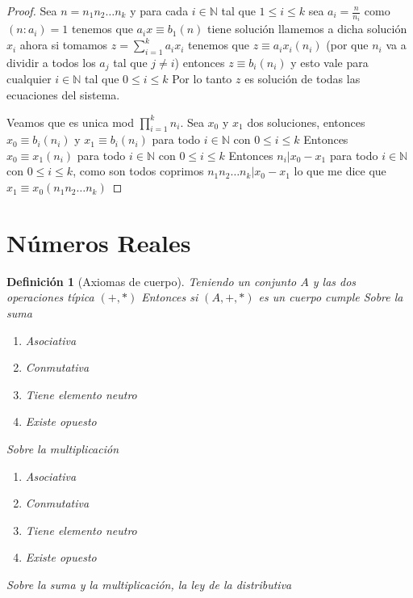 \documentclass{article}
\theoremstyle{break}
\newtheorem{definition}{Definición}[section]
\def \N{\mathbb{N}}
\begin{document}
        \begin{proof}
                Sea $n = n_1n_2\ldots n_k$ y para cada $i\in\N$ tal que $1\leq i \leq k$ sea 
                $a_i = \frac{n}{n_i}$ como $(n:a_i) = 1$ tenemos que $a_ix \equiv b_1 (n)$ tiene solución
                llamemos a dicha solución $x_i$ ahora si tomamos $z = \sum_{i=1}^{k} a_ix_i$ tenemos que 
                $z \equiv a_ix_i (n_i)$ (por que $n_i$ va a dividir a todos los $a_j$ tal que $j\neq i $)
                entonces $z \equiv b_i (n_i)$ y esto vale para cualquier $i\in\N$ tal que $0\leq i \leq k$
                Por lo tanto $z$ es solución de todas las ecuaciones del sistema.

                Veamos que es unica mod $\prod_{i=1}^k n_i$. Sea $x_0$ y $x_1$ dos soluciones, entonces
                $x_0\equiv b_i (n_i)$ y $x_1\equiv b_i(n_i)$ para todo $i\in\N$ con $0\leq i \leq k$
                Entonces $x_0\equiv x_1 (n_i)$ para todo $i\in\N$ con $0\leq i \leq k$
                Entonces $n_i| x_0 - x_1$ para todo $i\in\N$ con $0\leq i \leq k$, como son todos coprimos
                $n_1n_2\ldots n_k | x_0 - x_1$ lo que me dice que $x_1 \equiv x_0 (n_1n_2\ldots n_k)$
        \end{proof}

        \newpage
        \section{Números Reales}
        \begin{definition}[Axiomas de cuerpo]
            Teniendo un conjunto $A$ y las dos operaciones típica $(+,*)$
            Entonces si $(A,+,*)$ es un cuerpo cumple
            Sobre la suma \begin{enumerate}
                \item Asociativa
                \item Conmutativa
                \item Tiene elemento neutro
                \item Existe opuesto
            \end{enumerate}
            Sobre la multiplicación
            \begin{enumerate}
                \item Asociativa
                \item Conmutativa
                \item Tiene elemento neutro
                \item Existe opuesto
            \end{enumerate}
            Sobre la suma y la multiplicación, la ley de la distributiva
        \end{definition}
\end{document}
